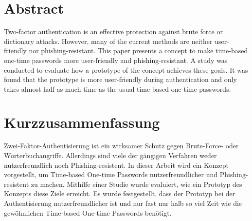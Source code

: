 \section*{Abstract}
Two-factor authentication is an effective protection against brute force or dictionary attacks. However, many of the current methods are neither user-friendly nor phishing-resistant. This paper presents a concept to make time-based one-time passwords more user-friendly and phishing-resistant. A study was conducted to evaluate how a prototype of the concept achieves these goals. It was found that the prototype is more user-friendly during authentication and only takes almost half as much time as the usual time-based one-time passwords.

\section*{Kurzzusammenfassung}
Zwei-Faktor-Authentisierung ist ein wirksamer Schutz gegen Brute-Force- oder Wörterbuchangriffe. Allerdings sind viele der gängigen Verfahren weder nutzerfreundlich noch Phishing-resistent. In dieser Arbeit wird ein Konzept vorgestellt, um Time-based One-time Passwords nutzerfreundlicher und Phishing-resistent zu machen. Mithilfe einer Studie wurde evaluiert, wie ein Prototyp des Konzepts diese Ziele erreicht. Es wurde festgestellt, dass der Prototyp bei der Authentisierung nutzerfreundlicher ist und nur fast nur halb so viel Zeit wie die gewöhnlichen Time-based One-time Passwords benötigt.